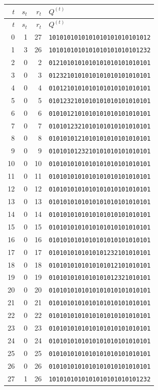 \documentclass[11pt]{article}
\begin{document}
\begingroup
\scriptsize
\setlength{\tabcolsep}{5pt}
\begin{longtable}{rrr l}
\toprule
$t$ & $s_t$ & $r_t$ & $Q^{(t)}$\\
\midrule
\endfirsthead
\toprule
$t$ & $s_t$ & $r_t$ & $Q^{(t)}$\\
\midrule
\endhead
0 & 1 & 27 & \texttt{1010101010101010101010101012}\\
1 & 3 & 26 & \texttt{1010101010101010101010101232}\\
2 & 0 & 2 & \texttt{0121010101010101010101010101}\\
3 & 0 & 3 & \texttt{0123210101010101010101010101}\\
4 & 0 & 4 & \texttt{0101210101010101010101010101}\\
5 & 0 & 5 & \texttt{0101232101010101010101010101}\\
6 & 0 & 6 & \texttt{0101012101010101010101010101}\\
7 & 0 & 7 & \texttt{0101012321010101010101010101}\\
8 & 0 & 8 & \texttt{0101010121010101010101010101}\\
9 & 0 & 9 & \texttt{0101010123210101010101010101}\\
10 & 0 & 10 & \texttt{0101010101010101010101010101}\\
11 & 0 & 11 & \texttt{0101010101010101010101010101}\\
12 & 0 & 12 & \texttt{0101010101010101010101010101}\\
13 & 0 & 13 & \texttt{0101010101010101010101010101}\\
14 & 0 & 14 & \texttt{0101010101010101010101010101}\\
15 & 0 & 15 & \texttt{0101010101010101010101010101}\\
16 & 0 & 16 & \texttt{0101010101010101010101010101}\\
17 & 0 & 17 & \texttt{0101010101010101232101010101}\\
18 & 0 & 18 & \texttt{0101010101010101012101010101}\\
19 & 0 & 19 & \texttt{0101010101010101012321010101}\\
20 & 0 & 20 & \texttt{0101010101010101010101010101}\\
21 & 0 & 21 & \texttt{0101010101010101010101010101}\\
22 & 0 & 22 & \texttt{0101010101010101010101010101}\\
23 & 0 & 23 & \texttt{0101010101010101010101010101}\\
24 & 0 & 24 & \texttt{0101010101010101010101010101}\\
25 & 0 & 25 & \texttt{0101010101010101010101010101}\\
26 & 0 & 26 & \texttt{0101010101010101010101010101}\\
27 & 1 & 26 & \texttt{1010101010101010101010101232}\\
\bottomrule
\end{longtable}
\endgroup
\end{document}
